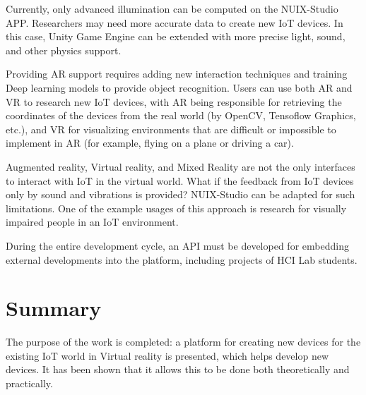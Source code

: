 Currently, only advanced illumination can be computed on the NUIX-Studio APP. Researchers may need more accurate data to create new IoT devices. In this case, Unity Game Engine can be extended with more precise light, sound, and other physics support.

Providing AR support requires adding new interaction techniques and training Deep learning models to provide object recognition. Users can use both AR and VR to research new IoT devices, with AR being responsible for retrieving the coordinates of the devices from the real world (by OpenCV, Tensoflow Graphics, etc.), and VR for visualizing environments that are difficult or impossible to implement in AR (for example, flying on a plane or driving a car).

Augmented reality, Virtual reality, and Mixed Reality are not the only interfaces to interact with IoT in the virtual world. What if the feedback from IoT devices only by sound and vibrations is provided? NUIX-Studio can be adapted for such limitations. One of the example usages of this approach is research for visually impaired people in an IoT environment.

During the entire development cycle, an API must be developed for embedding external developments into the platform, including projects of HCI Lab students. 

\section{Summary}

The purpose of the work is completed: a platform for creating new devices for the existing IoT world in Virtual reality is presented, which helps develop new devices. It has been shown that it allows this to be done both theoretically and practically.